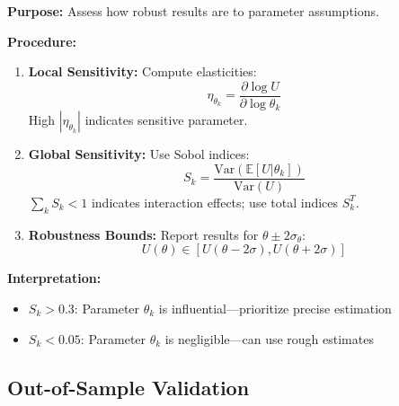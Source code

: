 \begin{tcolorbox}[colback=gray!5!white, colframe=gray!75!black,
    title=Diagnostic Protocol AZ-V3: Sensitivity Analysis]
\textbf{Purpose:} Assess how robust results are to parameter assumptions.

\textbf{Procedure:}
\begin{enumerate}[nosep]
\item \textbf{Local Sensitivity:} Compute elasticities:
\begin{equation}
\eta_{\theta_k} = \frac{\partial \log U}{\partial \log \theta_k}
\end{equation}
High $|\eta_{\theta_k}|$ indicates sensitive parameter.

\item \textbf{Global Sensitivity:} Use Sobol indices:
\begin{equation}
S_k = \frac{\text{Var}(\mathbb{E}[U | \theta_k])}{\text{Var}(U)}
\end{equation}
$\sum_k S_k < 1$ indicates interaction effects; use total indices $S^T_k$.

\item \textbf{Robustness Bounds:} Report results for $\theta \pm 2\sigma_\theta$:
\begin{equation}
U(\theta) \in [U(\theta - 2\sigma), U(\theta + 2\sigma)]
\end{equation}
\end{enumerate}

\textbf{Interpretation:}
\begin{itemize}[nosep]
\item $S_k > 0.3$: Parameter $\theta_k$ is influential---prioritize precise estimation
\item $S_k < 0.05$: Parameter $\theta_k$ is negligible---can use rough estimates
\end{itemize}
\end{tcolorbox}

\subsection{Out-of-Sample Validation}

